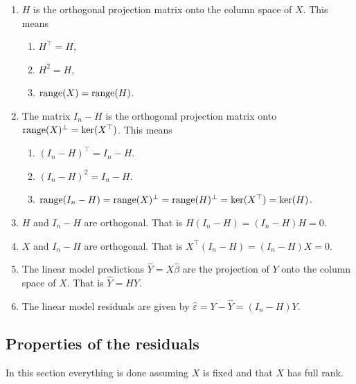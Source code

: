 \begin{enumerate}
\item $H$ is the orthogonal projection matrix onto the column space of $X$. This means
\begin{enumerate}
	\item $H^\top = H$,
	\item $H^2 = H$,
	\item $\mathrm{range}(X) = \mathrm{range}(H)$.
\end{enumerate}
\item The matrix $I_n - H$ is the orthogonal projection matrix onto $\mathrm{range}(X)^\perp = \ker(X^\top)$. This means
\begin{enumerate}
	\item $(I_n-H)^\top = I_n - H$.
	\item $(I_n-H)^2 = I_n - H$.
	\item $\mathrm{range}(I_n-H) = \mathrm{range}(X)^\perp = \mathrm{range}(H)^\perp = \ker(X^\top) = \ker(H)$.
\end{enumerate}
\item $H$ and $I_n-H$ are orthogonal. That is $H(I_n-H) = (I_n-H)H=0$.
\item $X$ and $I_n-H$ are orthogonal. That is $X^\top(I_n-H)=(I_n-H)X = 0$.
\item The linear model predictions $\hat{Y} = X \hat{\beta}$ are the projection of $Y$ onto the column space of $X$. That is $\hat{Y} = HY$.
\item The linear model residuals are given by $\hat{\varepsilon} = Y-\hat{Y} = (I_n -H) Y$.
\end{enumerate}

\subsection{Properties of the residuals}

In this section everything is done assuming $X$ is fixed and that $X$ has full rank.

